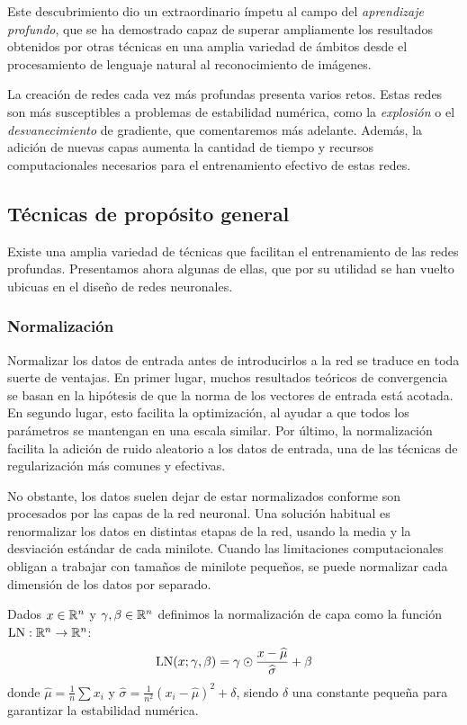 Este descubrimiento dio un extraordinario ímpetu al campo del \textit{aprendizaje profundo}, que se ha demostrado capaz de superar ampliamente los resultados obtenidos por otras técnicas en una amplia variedad de ámbitos desde el procesamiento de lenguaje natural al reconocimiento de imágenes.

La creación de redes cada vez más profundas presenta varios retos. Estas redes son más susceptibles a problemas de estabilidad numérica, como la \textit{explosión} o el \textit{desvanecimiento} de gradiente, que comentaremos más adelante. Además, la adición de nuevas capas aumenta la cantidad de tiempo y recursos computacionales necesarios para el entrenamiento efectivo de estas redes. 

\subsection{Técnicas de propósito general}
Existe una amplia variedad de técnicas que facilitan el entrenamiento de las redes profundas. Presentamos ahora algunas de ellas, que por su utilidad se han vuelto ubicuas en el diseño de redes neuronales.  

\subsubsection{Normalización}
Normalizar los datos de entrada antes de introducirlos a la red se traduce en toda suerte de ventajas. En primer lugar, muchos resultados teóricos de convergencia se basan en la hipótesis de que la norma de los vectores de entrada está acotada. En segundo lugar, esto facilita la optimización, al ayudar a que todos los parámetros se mantengan en una escala similar. Por último, la normalización facilita la adición de ruido aleatorio a los datos de entrada, una de las técnicas de regularización más comunes y efectivas. 

No obstante, los datos suelen dejar de estar normalizados conforme son procesados por las capas de la red neuronal. Una solución habitual es renormalizar los datos en distintas etapas de la red, usando la media y la desviación estándar de cada minilote. Cuando las limitaciones computacionales obligan a trabajar con tamaños de minilote pequeños, se puede normalizar cada dimensión de los datos por separado. 

\begin{definition}
    Dados \( x \in \mathbb{R}^{n} \) y \( \gamma, \beta \in \mathbb{R}^{n} \) definimos la normalización de capa como la función \( \operatorname{LN}: \mathbb{R}^{n} \to \mathbb{R}^{n} \):
    \[
        \operatorname{LN}(x; \gamma, \beta) = \gamma \odot \frac{x - \widehat{\mu}}{\widehat{\sigma}} + \beta
    \]
    donde \( \widehat{\mu} = \frac{1}{n} \sum x_i \) y \( \widehat{\sigma} = \frac{1}{n^2} (x_i - \widehat{\mu})^2 + \delta \), siendo \( \delta \) una constante pequeña para garantizar la estabilidad numérica.
\end{definition}

